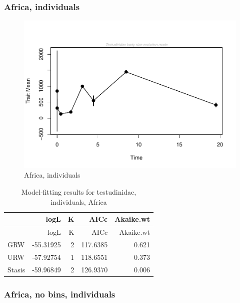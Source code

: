 \documentclass[]{article}
\begin{document}
\subsubsection{Africa, individuals}\label{africa-individuals}

\begin{figure}[htbp]
\centering
\includegraphics{MA_JJ_files/figure-latex/paleoTS, individuals, Africa-1.pdf}
\caption{Africa, individuals}
\end{figure}

\begin{longtable}[]{@{}lrrrr@{}}
\caption{Model-fitting results for testudinidae, individuals,
Africa}\tabularnewline
\toprule
& logL & K & AICc & Akaike.wt\tabularnewline
\midrule
\endfirsthead
\toprule
& logL & K & AICc & Akaike.wt\tabularnewline
\midrule
\endhead
GRW & -55.31925 & 2 & 117.6385 & 0.621\tabularnewline
URW & -57.92754 & 1 & 118.6551 & 0.373\tabularnewline
Stasis & -59.96849 & 2 & 126.9370 & 0.006\tabularnewline
\bottomrule
\end{longtable}

\newpage 

\subsubsection{Africa, no bins,
individuals}\label{africa-no-bins-individuals}
\end{document}
